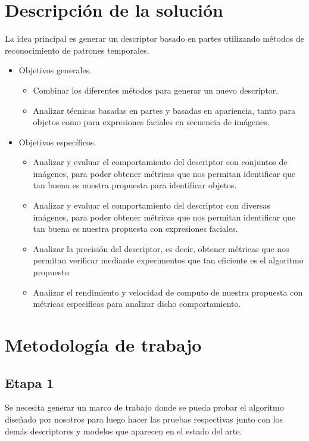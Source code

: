 \documentclass{udparticle}
\begin{document}
\section{Descripción de la solución}
La idea principal es generar un descriptor basado en partes utilizando métodos de reconocimiento de patrones temporales.
\begin{itemize}
\item Objetivos generales.
  \begin{itemize}
    \item Combinar los diferentes métodos para generar un nuevo descriptor.
    \item Analizar técnicas basadas en partes y basadas en apariencia, tanto para objetos como para expresiones faciales en secuencia de imágenes.
  \end{itemize}
\newpage
\item Objetivos específicos.
  \begin{itemize}
    \item Analizar y evaluar el comportamiento del descriptor con conjuntos de imágenes, para poder obtener métricas que nos permitan identificar que tan buena es nuestra propuesta para identificar objetos.
    \item Analizar y evaluar el comportamiento del descriptor con diversas imágenes, para poder obtener métricas que nos permitan identificar que tan buena es nuestra propuesta con expresiones faciales.
    \item Analizar la precisión del descriptor, es decir, obtener métricas que nos permitan verificar mediante experimentos que tan eficiente es el algoritmo propuesto.
    \item Analizar el rendimiento y velocidad de computo de nuestra propuesta con métricas especificas para analizar dicho comportamiento.
    
  \end{itemize}      

\end{itemize}

\section{Metodología de trabajo}
\subsection{Etapa 1}
Se necesita  generar un marco de trabajo donde se pueda probar el algoritmo diseñado por nosotros para luego hacer las pruebas respectivas junto con los demás descriptores y modelos que aparecen en el estado del arte.
\end{document}
